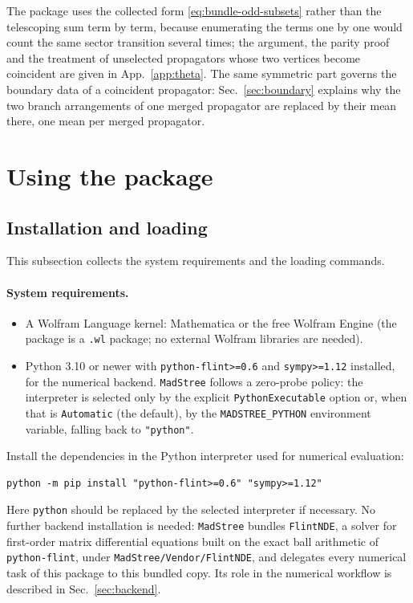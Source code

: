 \documentclass[11pt,a4paper]{article}
\begin{document}
The package uses the collected form \eqref{eq:bundle-odd-subsets} rather than the telescoping sum term
by term, because enumerating the terms one by one would count the same sector transition
several times; the argument, the parity proof and the treatment of unselected propagators whose two vertices
become coincident are given in App.~\ref{app:theta}. The same symmetric part governs the boundary data of
a coincident propagator: Sec.~\ref{sec:boundary} explains why the two branch arrangements of one merged
propagator are replaced by their mean there, one mean per merged propagator.



\section{Using the package}
\label{sec:usage}

\subsection{Installation and loading}
\label{sec:overview}

This subsection collects the system requirements and the loading commands.

\paragraph{System requirements.}
\begin{itemize}
  \item A Wolfram Language kernel: Mathematica or the free Wolfram Engine (the package is a
        \texttt{.wl} package; no external Wolfram libraries are needed).
  \item Python 3.10 or newer with \texttt{python-flint>=0.6} and \texttt{sympy>=1.12} installed, for the numerical backend.
        \texttt{MadStree} follows a zero-probe policy: the interpreter is selected only by the explicit
        \texttt{PythonExecutable} option or, when that is \texttt{Automatic} (the default), by the
        \texttt{MADSTREE\_PYTHON} environment variable, falling back to \texttt{"python"}.
\end{itemize}
Install the dependencies in the Python interpreter used for numerical evaluation:
\begin{verbatim}
python -m pip install "python-flint>=0.6" "sympy>=1.12"
\end{verbatim}
Here \texttt{python} should be replaced by the selected interpreter if necessary.
No further backend installation is needed: \texttt{MadStree} bundles \texttt{FlintNDE}, a solver for first-order
matrix differential equations built on the exact ball arithmetic of \texttt{python-flint}, under
\texttt{MadStree/Vendor/FlintNDE}, and delegates every numerical task of this package to this
bundled copy. Its role in the numerical workflow is described in Sec.~\ref{sec:backend}.
\end{document}
